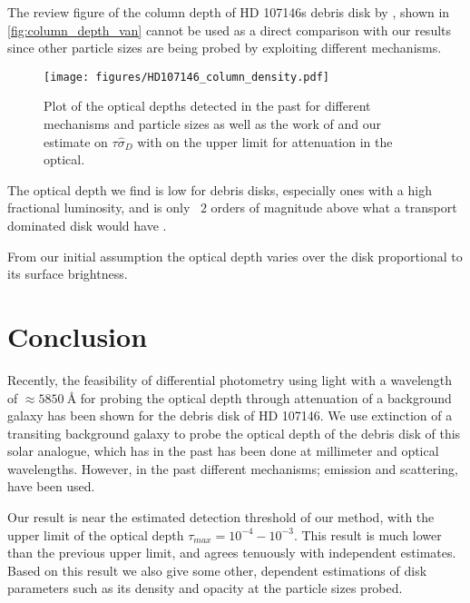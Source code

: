 \documentclass{aa}
\begin{document}
The review figure of the column depth of HD 107146s debris disk by \cite{vanSluijs2018feasibility}, shown in \autoref{fig:column_depth_van} cannot be used as a direct comparison with our results since other particle sizes are being probed by exploiting different mechanisms.


\begin{figure}[ht]
	\centering
	\texttt{[image: figures/HD107146\_column\_density.pdf]}
	\caption{Plot of the optical depths detected in the past for different mechanisms and particle sizes as well as the work of \cite{vanSluijs2018feasibility} and our estimate on $\tau \hat{\sigma}_{D}$ with on the upper limit for attenuation in the optical.}
	\label{fig:column_depth_van}
\end{figure}

The optical depth we find is low for debris disks, especially ones with a high fractional luminosity, and is only ~$2$ orders of magnitude above what a transport dominated disk would have \citep{krivov2010debris}.

From our initial assumption the optical depth varies over the disk proportional to its surface brightness.

\section{Conclusion}
\label{sec:conclusion}

Recently, the feasibility of differential photometry using light with a wavelength of $\approx 5850 ~\si{\angstrom}$ for probing the optical depth through attenuation of a background galaxy has been shown for the debris disk of HD 107146. We use extinction of a transiting background galaxy to probe the optical depth of the debris disk of this solar analogue, which has in the past has been done at millimeter and optical wavelengths. However, in the past different mechanisms; emission and scattering, have been used. 

Our result is near the estimated detection threshold of our method, with the upper limit of the optical depth $\tau_{max} = 10^{-4} - 10^{-3}$. This result is much lower than the previous upper limit, and agrees tenuously with independent estimates. Based on this result we also give some other, dependent estimations of disk parameters such as its density and opacity at the particle sizes probed.\\
\end{document}

